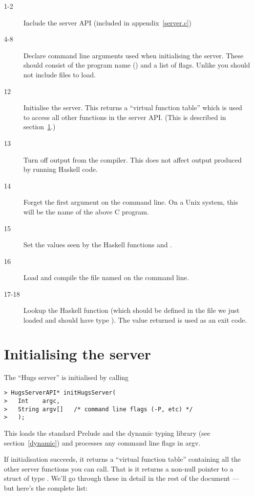 \begin{description}
\item[1-2] 
  Include the server API (included in appendix~\ref{server.c})
\item[4-8]
  Declare command line arguments used when initialising the server.
  These should consist of the program name () and
  a list of flags.  Unlike \Hugs{} you should not include files
  to load.
\item[12]
  Initialise the server.  This returns a ``virtual function table''
  which is used to access all other functions in the server API.
  (This is described in section~\ref{initHugs}.)
\item[13]
  Turn off output from the compiler. This does not affect output
  produced by running Haskell code.
\item[14]
  Forget the first argument on the command line.  On a Unix system,
  this will be the name of the above C program.
\item[15]
  Set the values seen by the Haskell functions 
  and .
\item[16]
  Load and compile the file named on the command line.
\item[17-18]
  Lookup the Haskell function  (which should be defined
  in the file we just loaded and should have type ).
  The value returned is used as an exit code.
\end{description}


\section{Initialising the server}\label{initHugs}

The ``Hugs server'' is initialised by calling 

\begin{verbatim}
> HugsServerAPI* initHugsServer(
>   Int    argc,
>   String argv[]   /* command line flags (-P, etc) */
>   );
\end{verbatim}

This loads the standard Prelude and the dynamic typing library (see
section~\ref{dynamic}) and processes any command line flags in argv.

If initialisation succeeds, it returns a ``virtual function table''
containing all the other server functions you can call.  That is it
returns a non-null pointer to a struct of type .
We'll go through these in detail in the rest of the document --- but
here's the complete list:

